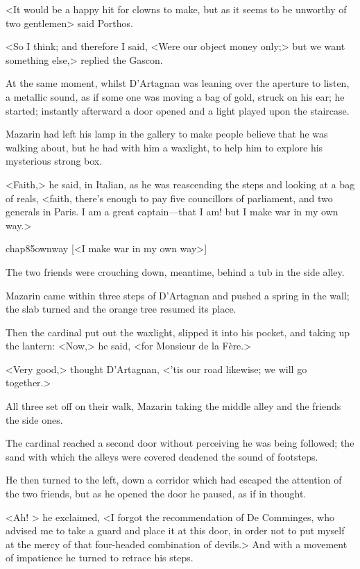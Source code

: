 <It would be a happy hit for clowns to make, but as it seems to be unworthy of two gentlemen\longdash> said Porthos.

<So I think; and therefore I said, <Were our object money only;> but we want something else,> replied the Gascon.

At the same moment, whilst D'Artagnan was leaning over the aperture to listen, a metallic sound, as if some one was moving a bag of gold, struck on his ear; he started; instantly afterward a door opened and a light played upon the staircase.

Mazarin had left his lamp in the gallery to make people believe that he was walking about, but he had with him a waxlight, to help him to explore his mysterious strong box.

<Faith,> he said, in Italian, as he was reascending the steps and looking at a bag of reals, <faith, there's enough to pay five councillors of parliament, and two generals in Paris. I am a great captain—that I am! but I make war in my own way.>

\begin{colorbigpic}
	[\basicscale] 
	{chap85ownway}
	[<I make war in my own way>]
\end{colorbigpic}

The two friends were crouching down, meantime, behind a tub in the side alley.

Mazarin came within three steps of D'Artagnan and pushed a spring in the wall; the slab turned and the orange tree resumed its place.

Then the cardinal put out the waxlight, slipped it into his pocket, and taking up the lantern: <Now,> he said, <for Monsieur de la Fère.>

<Very good,> thought D'Artagnan, <'tis our road likewise; we will go together.>

All three set off on their walk, Mazarin taking the middle alley and the friends the side ones.

The cardinal reached a second door without perceiving he was being followed; the sand with which the alleys were covered deadened the sound of footsteps.

He then turned to the left, down a corridor which had escaped the attention of the two friends, but as he opened the door he paused, as if in thought.

<Ah! > he exclaimed, <I forgot the recommendation of De Comminges, who advised me to take a guard and place it at this door, in order not to put myself at the mercy of that four-headed combination of devils.> And with a movement of impatience he turned to retrace his steps.

